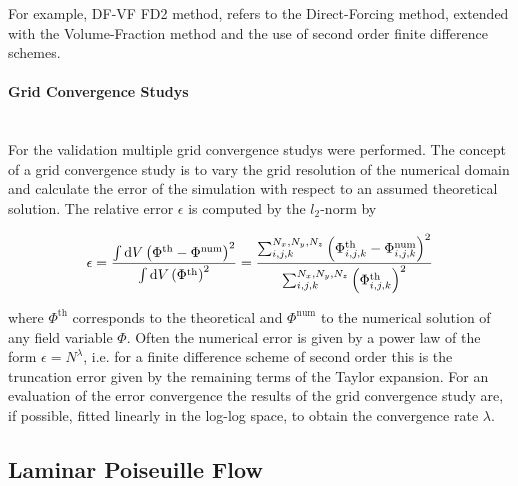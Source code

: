For example, DF-VF FD2 method, refers to the Direct-Forcing method, extended with the Volume-Fraction
method and the use of second order finite difference schemes.

\paragraph{Grid Convergence Studys}\mbox{}\\

For the validation multiple grid convergence studys were performed.
The concept of a grid convergence study is to vary the grid resolution of the numerical domain and
calculate the error of the simulation with respect to an assumed theoretical solution.
The relative error $\epsilon$ is computed by the $l_2$-norm by

\begin{align}
    \epsilon = \frac{\int \mathop{}\!\mathrm{d} V \left(\Phi^{\text{th}} - \Phi^{\text{num}}\right)^2}{\int \mathop{}\!\mathrm{d} V \left( \Phi^{\text{th}} \right)^2}
     = \frac{\sum_{i,j,k}^{N_x, N_y, N_z}
      \left(\Phi^{\text{th}}_{i,j,k}  - \Phi^{\text{num}}_{i, j, k}  \right)^2}
     {\sum_{i,j,k}^{N_x, N_y, N_z} \left( \Phi^{\text{th}}_{i,j,k} \right)^2}
 \end{align}

where $\Phi^{\text{th}}$ corresponds to the theoretical and $\Phi^{\text{num}}$ to the numerical solution of any field variable $\Phi$.
Often the numerical error is given by a power law of the form $\epsilon = N^\lambda$, i.e. for a finite difference scheme of second order
this is the truncation error given by the remaining terms  of the Taylor expansion.
For an evaluation of the error convergence the results of the grid convergence study are, if possible, fitted linearly in the log-log space, to obtain the
convergence rate $\lambda$.

\clearpage

\subsection{Laminar Poiseuille Flow}
\label{vali:sec_lpflow_setup}

